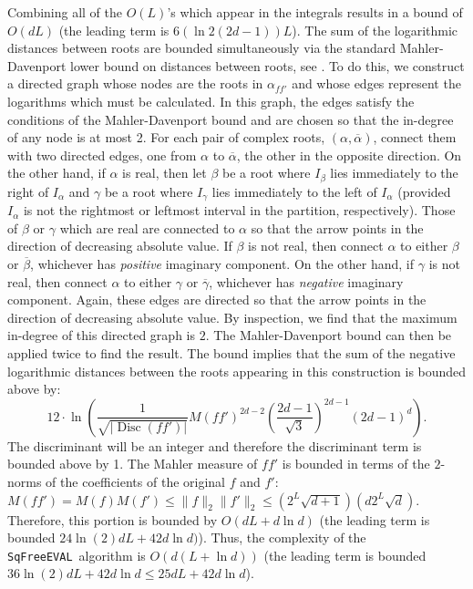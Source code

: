 \documentclass{amsart}
\theoremstyle{definition}
\DeclareMathOperator{\disc}{Disc}
\newcommand{\EVAL}{\texttt{SqFreeEVAL}}
\begin{document}
Combining all of the $O(L)$'s which appear in the integrals results in a bound of $O(dL)$ (the leading term is $6(\ln 2(2d-1))L$).  The sum of the logarithmic distances between roots are bounded simultaneously via the standard Mahler-Davenport lower bound on distances between roots, see \citep{davenport:85,du-sharma-yap:sturm:07,eigenwillig-sharma-yap:descartes:06}.  To do this, we construct a directed graph whose nodes are the roots in $\alpha_{f\!f'}$ and whose edges represent the logarithms which must be calculated.  In this graph, the edges satisfy the conditions of the Mahler-Davenport bound and are chosen so that the in-degree of any node is at most 2.  For each pair of complex roots, $(\alpha,\overline{\alpha})$, connect them with two directed edges, one from $\alpha$ to $\overline{\alpha}$, the other in the opposite direction.  On the other hand, if $\alpha$ is real, then let $\beta$ be a root where $I_\beta$ lies immediately to the right of $I_\alpha$ and $\gamma$ be a root where $I_\gamma$ lies immediately to the left of $I_\alpha$ (provided $I_\alpha$ is not the rightmost or leftmost interval in the partition, respectively).  Those of $\beta$ or $\gamma$ which are real are connected to $\alpha$ so that the arrow points in the direction of decreasing absolute value.  If $\beta$ is not real, then connect $\alpha$ to either $\beta$ or $\overline{\beta}$, whichever has {\em positive} imaginary component.  On the other hand, if $\gamma$ is not real, then connect $\alpha$ to either $\gamma$ or $\overline{\gamma}$, whichever has {\em negative} imaginary component.  Again, these edges are directed so that the arrow points in the direction of decreasing absolute value.  By inspection, we find that the maximum in-degree of this directed graph is $2$.  The Mahler-Davenport bound can then be applied twice to find the result.  The bound implies that the sum of the negative logarithmic distances between the roots appearing in this construction is bounded above by:
$$12\cdot\ln\left(\frac{1}{\sqrt{|\disc(f\!f')|}}M(f\!f')^{2d-2}\left(\frac{2d-1}{\sqrt{3}}\right)^{2d-1}(2d-1)^d\right).$$
The discriminant will be an integer and therefore the discriminant term is bounded above by 1.  The Mahler measure of $f\!f'$ is bounded in terms of the $2$-norms of the coefficients of the original $f$ and $f'$: $M(f\!f')=M(f)M(f')\leq \|f\|_2\|f'\|_2\leq (2^L\sqrt{d+1})(d2^L\sqrt{d})$.  Therefore, this portion is bounded by $O(dL+d\ln d)$ (the leading term is bounded $24\ln(2)dL+42d\ln d)$).  Thus, the complexity of the \EVAL\ algorithm is $O(d(L+\ln d))$ (the leading term is bounded $36\ln(2)dL+42d\ln d\leq 25dL+42d\ln d$).
\end{document}
